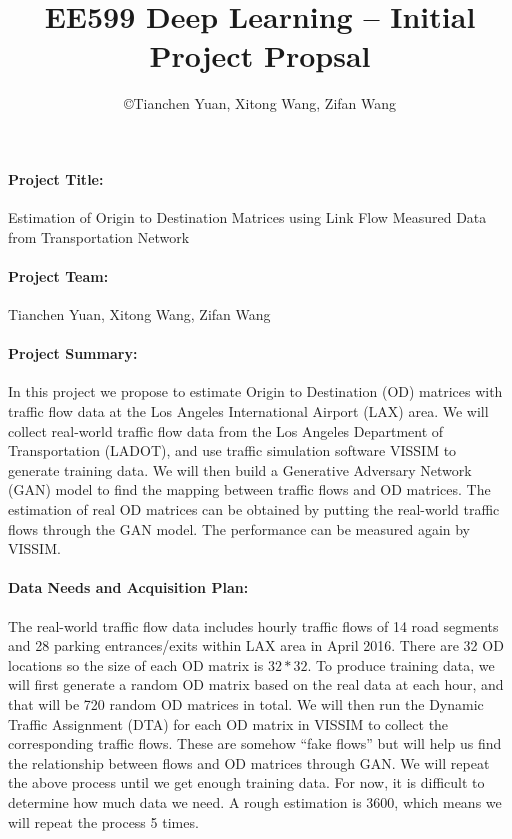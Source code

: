 \documentclass[11pt]{article}
\title{\bf EE599 Deep Learning -- Initial Project Propsal}
\author{\copyright  Tianchen Yuan, Xitong Wang, Zifan Wang}
\begin{document}
\maketitle

\paragraph{Project Title:}  Estimation of Origin to Destination Matrices using Link Flow Measured Data from Transportation Network

\paragraph{Project Team:} Tianchen Yuan, Xitong Wang, Zifan Wang 

\paragraph{Project Summary:} In this project we propose to estimate Origin to Destination (OD) matrices with traffic flow data at the Los Angeles International Airport (LAX) area. We will collect real-world traffic flow data from the Los Angeles Department of Transportation (LADOT), and use traffic simulation software VISSIM to generate training data. We will then build a Generative Adversary Network (GAN) model to find the mapping between traffic flows and OD matrices. The estimation of real OD matrices can be obtained by putting the real-world traffic flows through the GAN model. The performance can be measured again by VISSIM.  

\paragraph{Data Needs and Acquisition Plan:} The real-world traffic flow data includes hourly traffic flows of 14 road segments and 28 parking entrances/exits within LAX area in April 2016. There are 32 OD locations so the size of each OD matrix is $32*32$. To produce training data, we will first generate a random OD matrix based on the real data at each hour, and that will be 720 random OD matrices in total. We will then run the Dynamic Traffic Assignment (DTA) for each OD matrix in VISSIM to collect the corresponding traffic flows. These are somehow “fake flows” but will help us find the relationship between flows and OD matrices through GAN. We will repeat the above process until we get enough training data. For now, it is difficult to determine how much data we need. A rough estimation is 3600, which means we will repeat the process 5 times. 
\end{document}
